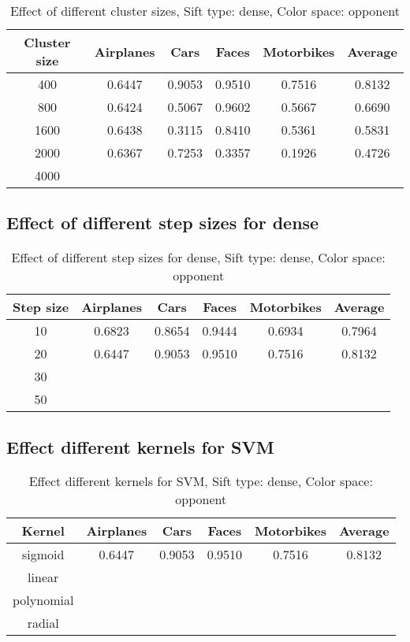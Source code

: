\begin{table}[h]
\begin{tabular}{|c|ccccc|}
\hline
\textbf{Cluster size} & \textbf{Airplanes} & \textbf{Cars} & \textbf{Faces} & \textbf{Motorbikes} & \textbf{Average}\\
\hline
400 & 0.6447 & 0.9053 & 0.9510 & 0.7516 & 0.8132\\
800 & 0.6424 & 0.5067 & 0.9602 & 0.5667 & 0.6690\\
1600 & 0.6438 & 0.3115 & 0.8410 & 0.5361 & 0.5831 \\
2000 & 0.6367 & 0.7253 & 0.3357 & 0.1926 & 0.4726\\
4000 & & & & & \\
\hline
\end{tabular}
\caption{Effect of different cluster sizes, Sift type: dense, Color space: opponent}
\end{table}

\subsection{Effect of different step sizes for dense}

\begin{table}[H]
\begin{tabular}{|c|ccccc|}
\hline
\textbf{Step size} & \textbf{Airplanes} & \textbf{Cars} & \textbf{Faces} & \textbf{Motorbikes} & \textbf{Average}\\
\hline
10 & 0.6823 & 0.8654 & 0.9444 & 0.6934 & 0.7964\\
20 & 0.6447 & 0.9053 & 0.9510 & 0.7516 & 0.8132\\
30 & & & & & \\
50 & & & & & \\
\hline
\end{tabular}
\caption{Effect of different step sizes for dense, Sift type: dense, Color space: opponent}
\end{table}


\subsection{Effect different kernels for SVM}

\begin{table}[H]
\begin{tabular}{|c|ccccc|}
\hline
\textbf{Kernel} & \textbf{Airplanes} & \textbf{Cars} & \textbf{Faces} & \textbf{Motorbikes} & \textbf{Average}\\
\hline
sigmoid & 0.6447 & 0.9053 & 0.9510 & 0.7516 & 0.8132\\
linear & & & & & \\
polynomial & & & & & \\
radial & & & & & \\
\hline
\end{tabular}
\caption{Effect different kernels for SVM, Sift type: dense, Color space: opponent}
\end{table}

